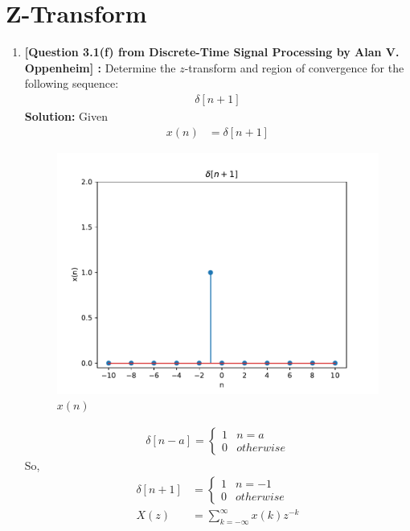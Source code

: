 \documentclass[journal,12pt,twocolumn]{IEEEtran}
\newcommand{\solution}{\noindent \textbf{Solution: }}
\providecommand{\sbrak}[1]{\ensuremath{\left[#1\right]}}
\numberwithin{equation}{section}
\begin{document}
 \section{Z-Transform}
\begin{enumerate}[label=\arabic*]
\item \textbf{[Question 3.1(f) from Discrete-Time Signal Processing by Alan V. Oppenheim] : }Determine the $z$-transform and region of convergence for the following sequence:
\begin{align}
\delta\sbrak{n+1}
\end{align}
\solution Given
\begin{align}
x(n)& = \delta\sbrak{n+1}
\end{align}
\begin{figure}[!ht]
\begin{center}
\includegraphics[width=\columnwidth]{./figs/unitsample}
\end{center}
\caption{$x(n)$}
\label{fig:1}	
\end{figure}
\begin{align}
\delta\sbrak{n-a}=
\begin{cases}
1 & n=a\\
0 & otherwise
\end{cases}
\end{align}
So,
\begin{align}
\delta\sbrak{n+1}&=
\begin{cases}
1 & n=-1\\
0 & otherwise
\end{cases}\\
X(z) &= \sum_{k=-\infty}^{\infty}x(k)z^{-k}\\

\end{align}
\end{enumerate}
\end{document}
